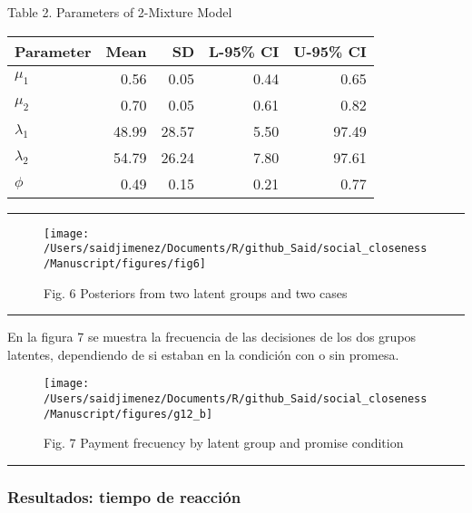 \documentclass[12pt,]{article}
\begin{document}
Table 2. Parameters of 2-Mixture Model

\begin{longtable}[]{@{}lrrrr@{}}
\toprule
Parameter & Mean & SD & L-95\% CI & U-95\% CI\tabularnewline
\midrule
\endhead
\(\mu_{1}\) & 0.56 & 0.05 & 0.44 & 0.65\tabularnewline
\(\mu_{2}\) & 0.70 & 0.05 & 0.61 & 0.82\tabularnewline
\(\lambda_{1}\) & 48.99 & 28.57 & 5.50 & 97.49\tabularnewline
\(\lambda_{2}\) & 54.79 & 26.24 & 7.80 & 97.61\tabularnewline
\(\phi\) & 0.49 & 0.15 & 0.21 & 0.77\tabularnewline
\bottomrule
\end{longtable}

\begin{center}\rule{0.5\linewidth}{\linethickness}\end{center}

\begin{figure}

{\centering \texttt{[image: /Users/saidjimenez/Documents/R/github\_Said/social\_closeness/Manuscript/figures/fig6]} 

}

\caption{Fig. 6 Posteriors from two latent groups and two cases}\label{fig:fig6}
\end{figure}

\begin{center}\rule{0.5\linewidth}{\linethickness}\end{center}

En la figura 7 se muestra la frecuencia de las decisiones de los dos
grupos latentes, dependiendo de si estaban en la condición con o sin
promesa.

\begin{figure}

{\centering \texttt{[image: /Users/saidjimenez/Documents/R/github\_Said/social\_closeness/Manuscript/figures/g12\_b]} 

}

\caption{Fig. 7 Payment frecuency by latent group and promise condition}\label{fig:fig7}
\end{figure}

\begin{center}\rule{0.5\linewidth}{\linethickness}\end{center}

\subsubsection{Resultados: tiempo de
reacción}\label{resultados-tiempo-de-reaccion}
\end{document}
